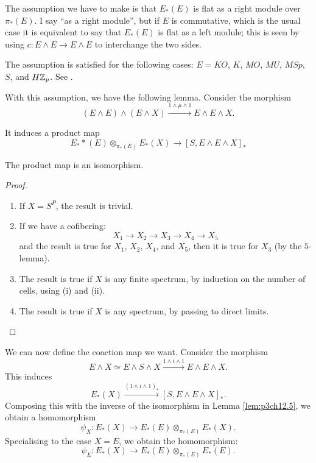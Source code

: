 \documentclass[../main]{subfiles}
\begin{document}
The assumption we have to make is that $E_\ast(E)$ is flat as a right module over $\pi_\ast(E)$. I say ``as a right module'', but if $E$ is commutative, which is the usual case it is equivalent to say that $E_\ast(E)$ is flat as a left module; this is seen by using $c\colon E\wedge E\longrightarrow E\wedge E$ to interchange the two sides.

The assumption is satisfied for the following cases: $E=KO$, $K$, $MO$, $MU$, $MSp$, $S$, and $H\mathbb{Z}_p$. %
See .

With this assumption, we have the following lemma. Consider the morphism
\[ (E\wedge E)\wedge (E\wedge X)\xrightarrow{1\wedge\mu\wedge1} E\wedge E\wedge X . \]

It induces a product map
\[ E_\ast*(E)\otimes_{\pi_\ast(E)}E_\ast(X)\longrightarrow[S,E\wedge E\wedge X]_\ast \]

\begin{lemma} \label{lem:p3ch12.5}
The product map is an isomorphism.
\end{lemma}

\begin{proof}

\begin{enumerate}
    \item If $X=S^P$, the result is trivial.
    \item If we have a cofibering:
    \[ X_1\longrightarrow X_2\longrightarrow X_3\longrightarrow X_4\longrightarrow X_5 \]
    and the result is true for $X_1$, $X_2$, $X_4$, and $X_5$, then it is true for $X_3$ (by the $5$-lemma).
    \item The result is true if $X$ is any finite spectrum, by induction on the number of cells, using (i) and (ii).
    \item The result is true if $X$ is any spectrum, by passing to direct limits.
\end{enumerate}

\end{proof}

We can now define the coaction map we want. Consider the morphism
\[ E\wedge X\simeq E\wedge S\wedge X\xrightarrow{1\wedge i\wedge 1}E\wedge E\wedge X . \]
This induces
\[ E_\ast(X)\xrightarrow{(1\wedge i\wedge 1)_\ast}[S,E\wedge E\wedge X]_\ast . \]
Composing this with the inverse of the isomorphism in Lemma \ref{lem:p3ch12.5}, we obtain a homomorphism
\[ \psi_X\colon E_\ast(X)\longrightarrow E_\ast(E)\otimes_{\pi_\ast(E)}E_\ast(X) . \]
Specialising to the case $X=E$, we obtain the homomorphism:
\[ \psi_E\colon E_\ast(X)\longrightarrow E_\ast(E)\otimes_{\pi_\ast(E)}E_\ast(E) . \]
\end{document}
